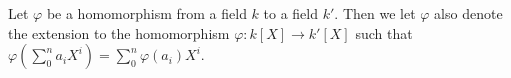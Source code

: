 Let $\varphi$ be a homomorphism from a field $k$ to a field $k'$. Then we let $\varphi$ also denote the extension to the homomorphism $\varphi: k[X] \to k'[X]$ such that $\varphi(\sum_0^n a_i X^i) = \sum_0^n \varphi(a_i) X^i$.
